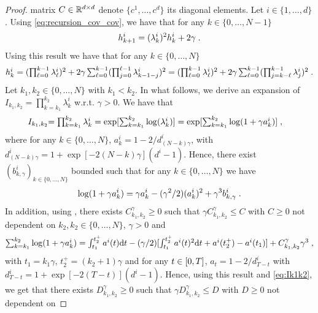 \begin{proof}
matrix $C \in \mathbb{R}^{d \times d}$ denote $\{c^1, \dots, c^d\}$ its diagonal
elements. Let $i \in \{1, \dots, d\}$. Using \eqref{eq:recursion_cov_cov}, we have
that for any $k \in \{0, \dots, N-1\}$
\begin{equation}
  h_{k+1}^i = (\lambda_k^i)^2 h_k^i + 2 \gamma \; . 
\end{equation}
Using this result we have that for any $k \in \{0, \dots, N\}$
\begin{equation}
  \label{eq:unroll_recursion}
  \textstyle{
    h_k^i = (\prod_{\ell=0}^{k-1} \lambda_\ell^i)^2 + 2\gamma \sum_{\ell=0}^{k-1} (\prod_{j=0}^{\ell-1} \lambda_{k-1-j}^i)^2 = (\prod_{\ell=0}^{k-1} \lambda_\ell^i)^2 + 2\gamma \sum_{\ell=0}^{k-1} (\prod_{j=k-\ell}^{k-1} \lambda_{j}^i)^2 \;. 
    }
\end{equation}
Let $k_1, k_2 \in \{0, \dots, N\}$ with $k_1 < k_2$. In what follows, we derive
an expansion of $I_{k_1, k_2} = \prod_{k=k_1}^{k_2} \lambda_k^i$ w.r.t.
$\gamma >0$. We have that
\begin{align}
  \label{eq:Ik1k2}
I_{k_1, k_2} &\textstyle{= \prod_{k=k_1}^{k_2} \lambda_k^i = \exp[\sum_{k=k_1}^{k_2} \log(\lambda_k^i)] = \exp[\sum_{k=k_1}^{k_2} \log(1 + \gamma a_k^i)]} \; , 
\end{align}
where for any $k \in \{0, \dots, N\}$, $a_k^i = 1 - 2/d_{(N-k)\gamma}^i$, with
$d_{(N-k)\gamma}^i = 1 + \exp[-2(N-k)\gamma](d^i - 1)$.  Hence, there exist
$(b_{k, \gamma}^i)_{k \in \{0, \dots, N\}}$ bounded  such that for any $k \in \{0, \dots, N\}$ we have
\begin{equation}
  \log(1 + \gamma a_k^i) = \gamma a_k^i - (\gamma^2/2) (a_k^i)^2 + \gamma^3 b_{k, \gamma}^i \; . 
\end{equation}
In addition, using , there exists
$C_{k_1, k_2}^\gamma \geq 0$ such that $ \gamma C_{k_1, k_2}^\gamma \leq C$ with
$C \geq 0$ not dependent on $k_2, k_2 \in \{0, \dots, N\}$, $\gamma >0$ and
\begin{equation}
  \textstyle{
    \sum_{k=k_1}^{k_2} \log(1 + \gamma a_k^i) = \int_{t_1}^{t_2^+} a^i(t) \mathrm{d}t - (\gamma/2) [\int_{t_1}^{t_2^+} a^i(t)^2 \mathrm{d}t + a^i(t_2^+) - a^i(t_1)] + C_{k_1, k_2}^\gamma \gamma^3  \;,
    }
  \end{equation}
  with $t_1 = k_1 \gamma$, $t_2^+ = (k_2 + 1) \gamma$ and for any
  $t \in \left[0,T\right]$, $a_t = 1 - 2/d_{T-t}^i$ with
  $d_{T-t}^i = 1 + \exp[-2(T-t)](d^i - 1)$.  Hence, using this result and
  \eqref{eq:Ik1k2}, we get that there exists $D_{k_1, k_2}^\gamma \geq 0$ such
  that $ \gamma D_{k_1, k_2}^\gamma \leq D$ with $D \geq 0$ not dependent on

\end{proof}
